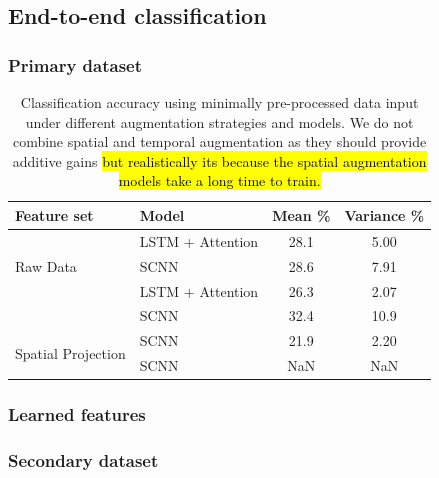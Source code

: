 \documentclass[utf8]{frontiersSCNS} %
\begin{document}

\subsection{End-to-end classification}

\subsubsection{Primary dataset}

\begin{table}[t]
  \centering
  \label{tab:end2end_results}
  \begin{tabular}{l l | c | c}
    \toprule
    \textbf{Feature set} & \textbf{Model} & \textbf{Mean \%} & \textbf{Variance \%} \\
    \toprule
    \multirow{3}{*}{Raw Data}
                         & LSTM + Attention    & 28.1 & 5.00  \\ 
                         & SCNN                & 28.6 & 7.91  \\
    \midrule
    \multirow{3}{*}{Temporal Augmentation}
                         & LSTM + Attention    & 26.3 & 2.07  \\ 
                         & SCNN                & 32.4 & 10.9  \\
    \midrule
    \multirow{3}{*}{Spatial Projection}
                         & SCNN                & 21.9 & 2.20  \\
    \midrule
    \multirow{3}{*}{Spatial Augmentation}
                         & SCNN                & NaN & NaN  \\
    
    \bottomrule
  \end{tabular}
  \caption{Classification accuracy using minimally pre-processed data input under different augmentation strategies and models. We do not combine spatial and temporal augmentation as they should provide additive gains \hl{but realistically its because the spatial augmentation models take a long time to train.}}
\end{table}

\subsubsection{Learned features}

\subsubsection{Secondary dataset}
\end{document}
